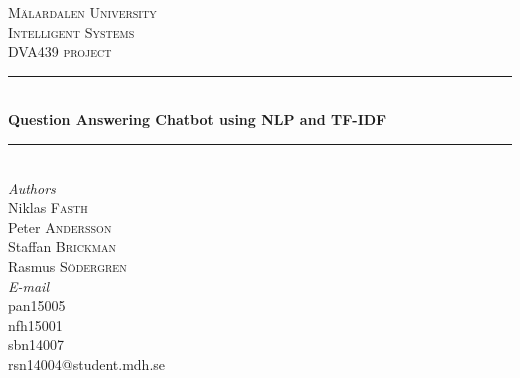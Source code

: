 
\begin{titlepage} %
	\newcommand{\HRule}{\rule{\linewidth}{0.5mm}} %
	
	\center %
	
	
	\textsc{\LARGE Mälardalen University}\\[1.5cm] %
	
	\textsc{\Large Intelligent Systems}\\[0.5cm] %
	
	\textsc{\large DVA439 project}\\[0.5cm] %
	
	
	\HRule\\[0.4cm]
	
	{\huge\bfseries Question Answering Chatbot using NLP and TF-IDF}\\[0.4cm] %
	
	\HRule\\[1.5cm]
	
	
			\large\textit{Authors}\\
			Niklas \textsc{Fasth}\\ 
			Peter \textsc{Andersson}\\
			Staffan \textsc{Brickman}\\
            Rasmus \textsc{Södergren}\\
    
			\large\textit{E-mail}\\
			pan15005\\ 
            nfh15001\\
            sbn14007\\
            rsn14004@student.mdh.se\\ 
	

\end{titlepage}
